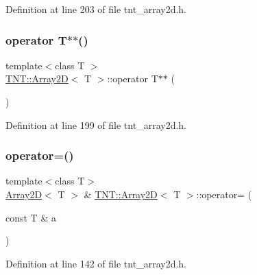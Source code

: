 Definition at line 203 of file tnt\+\_\+array2d.\+h.

\mbox{\label{classTNT_1_1Array2D_ab0edc94ba076bb743ace676d7717260c}} 
\subsubsection{\texorpdfstring{operator T$\ast$$\ast$()}{operator T**()}}
{\footnotesize\ttfamily template$<$class T $>$ \\
\hyperlink{classTNT_1_1Array2D}{T\+N\+T\+::\+Array2D}$<$ T $>$\+::operator T$\ast$$\ast$ (\begin{DoxyParamCaption}{ }\end{DoxyParamCaption})\hspace{0.3cm}{\ttfamily [inline]}}



Definition at line 199 of file tnt\+\_\+array2d.\+h.

\mbox{\label{classTNT_1_1Array2D_af14c53b4b3977ab8ecb34da61e5a6e4c}} 
\subsubsection{\texorpdfstring{operator=()}{operator=()}\hspace{0.1cm}{\footnotesize\ttfamily [1/2]}}
{\footnotesize\ttfamily template$<$class T$>$ \\
\hyperlink{classTNT_1_1Array2D}{Array2D}$<$ T $>$ \& \hyperlink{classTNT_1_1Array2D}{T\+N\+T\+::\+Array2D}$<$ T $>$\+::operator= (\begin{DoxyParamCaption}\item[{const T \&}]{a }\end{DoxyParamCaption})\hspace{0.3cm}{\ttfamily [inline]}}



Definition at line 142 of file tnt\+\_\+array2d.\+h.

\mbox{\label{classTNT_1_1Array2D_a291213171560381b270246be0bbe75c0}} 
